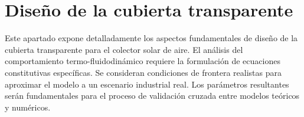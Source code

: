 \section{Diseño de la cubierta transparente}
\label{sec:cap05_cubierta}

Este apartado expone detalladamente los aspectos fundamentales de diseño de la cubierta transparente para el colector solar de aire.
El análisis del comportamiento termo-fluidodinámico requiere la formulación de ecuaciones constitutivas específicas.
Se consideran condiciones de frontera realistas para aproximar el modelo a un escenario industrial real.
Los parámetros resultantes serán fundamentales para el proceso de validación cruzada entre modelos teóricos y numéricos.
